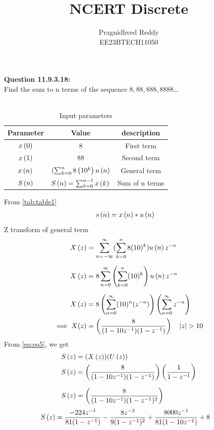 \documentclass[journal,12pt,twocolumn]{IEEEtran}
\title{NCERT Discrete}
\author{Pragnidhved Reddy\\EE23BTECH11050}
\date{}
\begin{document}
\maketitle
\newpage
\bigskip
\textbf{Question 11.9.3.18:}\\
 Find the sum to n terms of the sequence $8,88,888,8888$\ldots\\
 \solution \\
 \begin{table}[H]
\centering
\setlength{\extrarowheight}{8pt}
\begin{tabular}{|c|c|c|}\hline
\textbf{Parameter} & \textbf{Value} & \textbf{description}\\ \hline
$x\left(0\right)$ & 8 & First term \\ \hline
$x\left(1\right)$ & 88 & Second term \\ \hline 
$x\left(n\right)$ & $(\sum^{n}_{k=0}8\left(10^k\right)u\left(n\right)$ & General term \\ \hline
$S\left(n\right)$ & $S\left(n\right)=\sum^{n-1}_{k=0}x\left(k\right)$ & Sum of n terms \\ \hline
\end{tabular}
\caption{Input parameters}
\label{tab:table1}
\end{table}
 From \eqref{tab:table1}
\begin{align}
\label{eq:eq5}
 s\left(n\right)&=x\left(n\right)* u\left(n\right)
 \end{align}
 Z transform of general term
 \begin{align}
 X\left(z\right)&=\sum_{n=-\infty}^{\infty}(\sum_{k=0}^{n}8(10)^k)u\left(n\right)z^{-n}\\[6pt]
 X\left(z\right)&=8\sum_{n=0}^{\infty}\left(\sum_{k=0}^{n}(10)^k\right)u\left(n\right)z^{-n}\\[6pt]
 X\left(z\right)&=8\left(\sum_{n=0}^{\infty}(10)^n(z^{-n})\right)\left(\sum_{n=0}^{\infty}z^{-n}\right)\\
 \implies X(z)&=\left(\frac{8}{(1-10z^{-1})(1-z^{-1})}\right) \quad \left\vert z\right\vert>10
\end{align}
From \eqref{eq:eq5}, we get
 \begin{align}
 S\left(z\right)&=(X\left(z\right))(U\left(z\right))\\
 S\left(z\right)&=\left(\frac{8}{(1-10z^{-1})(1-z^{-1})}\right)\left(\frac{1}{1-z^{-1}}\right)\\[6pt]
 S\left(z\right)&=\left(\frac{8}{(1-10z^{-1})(1-z^{-1})^2}\right)
\end{align}
\begin{align}
 S\left(z\right)&=\frac{-224z^{-1}}{81(1-z^{-1})}-\frac{8z^{-2}}{9(1-z^{-1})^2}+\frac{8000z^{-1}}{81(1-10z^{-1})}+8
 \end{align}
\end{document}
